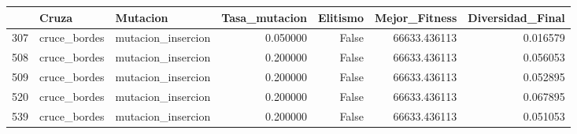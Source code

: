 \begin{tabular}{lllrrrr}
\toprule
 & Cruza & Mutacion & Tasa_mutacion & Elitismo & Mejor_Fitness & Diversidad_Final \\
\midrule
307 & cruce_bordes & mutacion_insercion & 0.050000 & False & 66633.436113 & 0.016579 \\
508 & cruce_bordes & mutacion_insercion & 0.200000 & False & 66633.436113 & 0.056053 \\
509 & cruce_bordes & mutacion_insercion & 0.200000 & False & 66633.436113 & 0.052895 \\
520 & cruce_bordes & mutacion_insercion & 0.200000 & False & 66633.436113 & 0.067895 \\
539 & cruce_bordes & mutacion_insercion & 0.200000 & False & 66633.436113 & 0.051053 \\
\bottomrule
\end{tabular}
